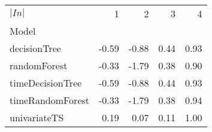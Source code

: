 \begin{tabular}{lrrrr}
\toprule
$|In|$ & 1 & 2 & 3 & 4 \\
Model &  &  &  &  \\
\midrule
decisionTree & -0.59 & -0.88 & 0.44 & 0.93 \\
randomForest & -0.33 & -1.79 & 0.38 & 0.90 \\
timeDecisionTree & -0.59 & -0.88 & 0.44 & 0.93 \\
timeRandomForest & -0.33 & -1.79 & 0.38 & 0.94 \\
univariateTS & 0.19 & 0.07 & 0.11 & 1.00 \\
\bottomrule
\end{tabular}
